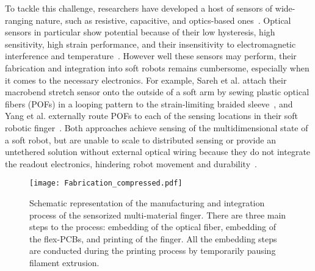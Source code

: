 To tackle this challenge, researchers have developed a host of sensors of wide-ranging nature, such as resistive, capacitive, and optics-based ones~\cite{Truby2019,Toshimitsu2021,Georgopoulou2023,optoelectronically_innervated_hand_zhao}. Optical sensors in particular show potential because of their low hysteresis, high sensitivity, high strain performance, and their insensitivity to electromagnetic interference and temperature~\cite{flexible_sensing_qu,Hegde2023}. However well these sensors may perform, their fabrication and integration into soft robots remains cumbersome, especially when it comes to the necessary electronics. For example, Sareh et al. attach their macrobend stretch sensor onto the outside of a soft arm by sewing plastic optical fibers (POFs) in a looping pattern to the strain-limiting braided sleeve~\cite{macrobend_optical_sensing_sareh}, and Yang et al. externally route POFs to each of the sensing locations in their soft robotic finger~\cite{Yang2020}. Both approaches achieve sensing of the multidimensional state of a soft robot, but are unable to scale to distributed sensing or provide an untethered solution without external optical wiring because they do not integrate the readout electronics, hindering robot movement and durability~\cite{Rich2018}. 
\begin{figure*}[ht]
    \centering
    \texttt{[image: Fabrication\_compressed.pdf]}
    \caption{Schematic representation of the manufacturing and integration process of the sensorized multi-material finger. There are three main steps to the process: embedding of the optical fiber, embedding of the flex-PCBs, and printing of the finger. All the embedding steps are conducted during the printing process by temporarily pausing filament extrusion.}
    \label{fig:fabrication_figure}
    \vspace{-1em}
\end{figure*}

